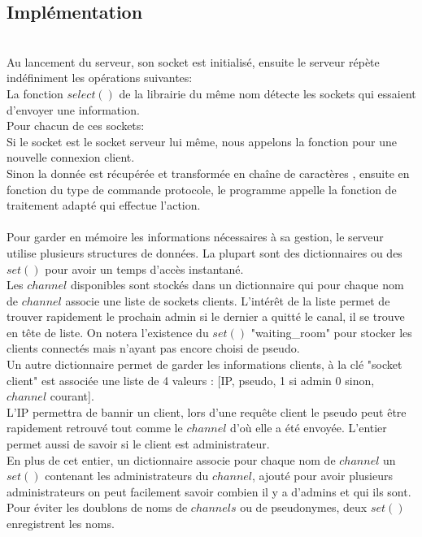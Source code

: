 \documentclass[12pt]{article}
\begin{document}
\subsection{Implémentation}
\\Au lancement du serveur, son socket est initialisé, ensuite le serveur répète indéfiniment
les opérations suivantes:
\\La fonction $select()$ de la librairie du même nom détecte les sockets qui essaient d'envoyer
une information.
\\Pour chacun de ces sockets:
\\Si le socket est le socket serveur lui même, nous appelons la fonction pour une nouvelle connexion client.
\\Sinon la donnée est récupérée et transformée en chaîne de caractères
, ensuite en fonction du type de commande protocole, le programme appelle la fonction
de traitement adapté qui effectue l'action.
\\

\\Pour garder en mémoire les informations nécessaires à sa gestion, le serveur utilise plusieurs
structures de données. La plupart sont des dictionnaires ou des $set()$ pour avoir un temps
d'accès instantané.
\\Les $channel$ disponibles sont stockés dans un dictionnaire qui pour chaque nom de $channel$
associe une liste de sockets clients. L'intérêt de la liste permet de trouver rapidement
le prochain admin si le dernier a quitté le canal, il se trouve en tête de liste.
On notera l'existence du $set()$ "waiting\_room" pour stocker les clients connectés mais n'ayant pas
encore choisi de pseudo.
\\Un autre dictionnaire permet de garder les informations clients, à la clé "socket client"
est associée une liste de 4 valeurs : [IP, pseudo, 1 si admin 0 sinon, $channel$ courant].
\\L'IP permettra de bannir un client, lors d'une requête client le pseudo peut être rapidement retrouvé tout comme le 
$channel$ d'où elle a été envoyée. L'entier permet aussi de savoir si le client est administrateur.
\\En plus de cet entier, un dictionnaire associe pour chaque nom de $channel$ un $set()$
contenant les administrateurs du $channel$, ajouté pour avoir plusieurs administrateurs on
peut facilement savoir combien il y a d'admins et qui ils sont.
\\Pour éviter les doublons de noms de $channels$ ou de pseudonymes, deux $set()$ enregistrent
les noms.
\\
\end{document}
